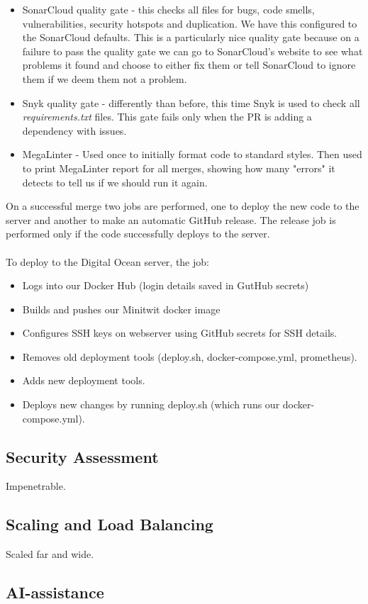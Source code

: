 \begin{itemize}
    \item SonarCloud quality gate - this checks all files for bugs, code smells, vulnerabilities, security hotspots and duplication. We have this configured to the SonarCloud defaults. This is a particularly nice quality gate because on a failure to pass the quality gate we can go to SonarCloud's website to see what problems it found and choose to either fix them or tell SonarCloud to ignore them if we deem them not a problem.
    \item Snyk quality gate - differently than before, this time Snyk is used to check all \textit{requirements.txt} files. This gate fails only when the PR is adding a dependency with issues.
    \item MegaLinter - Used once to initially format code to standard styles. Then used to print MegaLinter report for all merges, showing how many "errors" it detects to tell us if we should run it again.
\end{itemize}

On a successful merge two jobs are performed, one to deploy the new code to the server and another to make an automatic GitHub release. The release job is performed only if the code successfully deploys to the server.
\\\\
To deploy to the Digital Ocean server, the job:

\begin{itemize}
    \item Logs into our Docker Hub (login details saved in GutHub secrets)
    \item Builds and pushes our Minitwit docker image %
    \item Configures SSH keys on webserver using GitHub secrets for SSH details.
    \item Removes old deployment tools (deploy.sh, docker-compose.yml, prometheus).
    \item Adds new deployment tools.
    \item Deploys new changes by running deploy.sh (which runs our docker-compose.yml).
\end{itemize}

\subsection{Security Assessment}

Impenetrable.

\subsection{Scaling and Load Balancing}

Scaled far and wide.

\subsection{AI-assistance}

